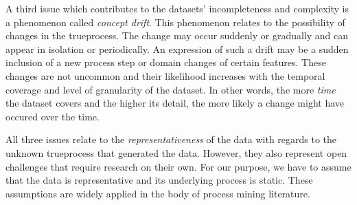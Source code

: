 \documentclass[./../../paper.tex]{subfiles}
\begin{document}
A third issue which contributes to the datasets' incompleteness and complexity is a phenomenon called \emph{concept drift}. This phenomenon relates to the possibility of changes in the \gls{trueprocess}. The change may occur suddenly or gradually and can appear in isolation or periodically. An expression of such a drift may be a sudden inclusion of a new process step or domain changes of certain features. These changes are not uncommon and their likelihood increases with the temporal coverage and level of granularity of the dataset\needscite{}. In other words, the more \emph{time} the dataset covers and the higher its detail, the more likely a change might have occured over the time.

All three issues relate to the \emph{representativeness} of the data with regards to the unknown \gls{trueprocess} that generated the data. However, they also represent open challenges that require research on their own. For our purpose, we have to assume that the data is representative and its underlying process is static. These assumptions are widely applied in the body of process mining literature\needscite{}.
\end{document}
